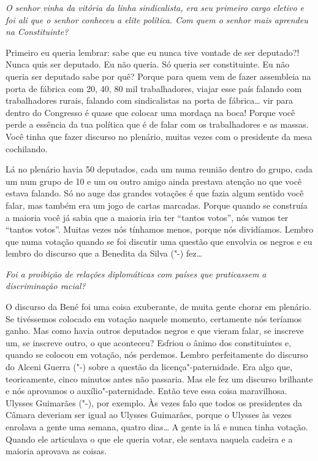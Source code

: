 \medskip

\noindent\emph{O senhor vinha da vitória da linha sindicalista, era seu
primeiro cargo eletivo e foi ali que o senhor conheceu a elite política.
Com quem o senhor mais aprendeu na Constituinte?}

Primeiro eu queria lembrar: sabe que eu nunca tive
vontade de ser deputado?! Nunca quis ser deputado. Eu não queria. Só
queria ser constituinte. Eu não queria ser deputado sabe por quê? Porque
para quem vem de fazer assembleia na porta de fábrica com 20, 40, 80 mil
trabalhadores, viajar esse país falando com trabalhadores rurais,
falando com sindicalistas na porta de fábrica\ldots{} vir para dentro do
Congresso é quase que colocar uma mordaça na boca! Porque você perde a
essência da tua política que é de falar com os trabalhadores e as
massas. Você tinha que fazer discurso no plenário, muitas vezes com o
presidente da mesa cochilando.

Lá no plenário havia 50 deputados, cada um numa reunião dentro do grupo,
cada um num grupo de 10 e um ou outro amigo ainda prestava atenção no
que você estava falando. Só no auge das grandes votações é que fazia
algum sentido você falar, mas também era um jogo de cartas marcadas.
Porque quando se construía a maioria você já sabia que a maioria iria
ter ``tantos votos'', nós vamos ter ``tantos votos''. Muitas vezes nós
tínhamos menos, porque nós dividíamos. Lembro que numa votação quando se
foi discutir uma questão que envolvia os negros e eu lembro do discurso
que a Benedita da Silva ("-) fez\ldots{}

\medskip

\noindent\emph{Foi a proibição de relações diplomáticas com países que
praticassem a discriminação racial?}

O discurso da Bené foi uma coisa exuberante, de muita
gente chorar em plenário. Se tivéssemos colocado em votação naquele
momento, certamente nós teríamos ganho. Mas como havia outros deputados
negros e que vieram falar, se inscreve um, se inscreve outro, o que
aconteceu? Esfriou o ânimo dos constituintes e, quando se colocou em
votação, nós perdemos. Lembro perfeitamente do discurso do Alceni Guerra
("-) sobre a questão da licença"-paternidade. Era algo que,
teoricamente, cinco minutos antes não passaria. Mas ele fez um discurso
brilhante e nós aprovamos o auxílio"-paternidade. Então teve essa coisa
maravilhosa. Ulysses Guimarães ("-), por exemplo. Às vezes falo que
todos os presidentes da Câmara deveriam ser igual ao Ulysses Guimarães,
porque o Ulysses às vezes enrolava a gente uma semana, quatro dias\ldots{} A
gente ia lá e nunca tinha votação. Quando ele articulava o que ele
queria votar, ele sentava naquela cadeira e a maioria aprovava as
coisas.

